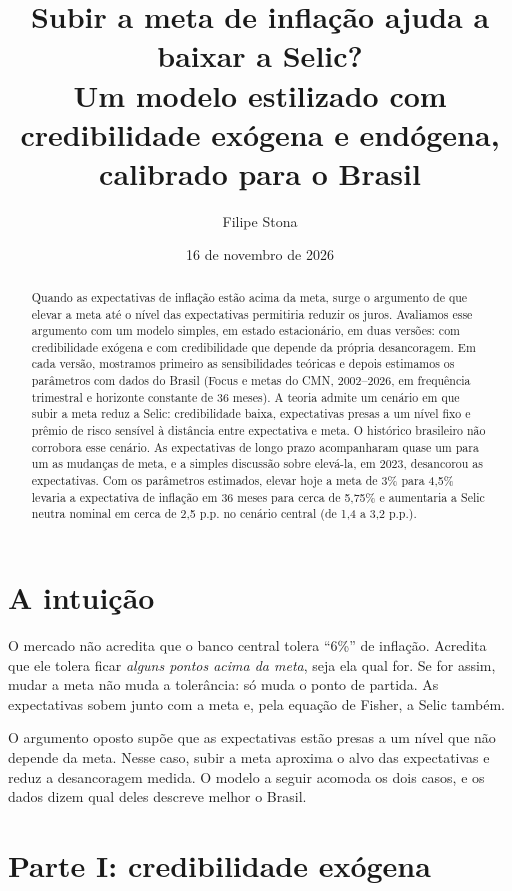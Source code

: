 \documentclass[11pt,a4paper]{article}
\title{Subir a meta de inflação ajuda a baixar a Selic?\\[0.3em]
\large Um modelo estilizado com credibilidade exógena e endógena, calibrado para o Brasil}
\author{Filipe Stona}
\date{16 de novembro de 2026}
\begin{document}
\maketitle

\begin{abstract}
\noindent Quando as expectativas de inflação estão acima da meta, surge o argumento de que elevar a meta até o nível das expectativas permitiria reduzir os juros. Avaliamos esse argumento com um modelo simples, em estado estacionário, em duas versões: com credibilidade exógena e com credibilidade que depende da própria desancoragem. Em cada versão, mostramos primeiro as sensibilidades teóricas e depois estimamos os parâmetros com dados do Brasil (Focus e metas do CMN, 2002--2026, em frequência trimestral e horizonte constante de 36 meses). A teoria admite um cenário em que subir a meta reduz a Selic: credibilidade baixa, expectativas presas a um nível fixo e prêmio de risco sensível à distância entre expectativa e meta. O histórico brasileiro não corrobora esse cenário. As expectativas de longo prazo acompanharam quase um para um as mudanças de meta, e a simples discussão sobre elevá-la, em 2023, desancorou as expectativas. Com os parâmetros estimados, elevar hoje a meta de 3\% para 4,5\% levaria a expectativa de inflação em 36 meses para cerca de 5,75\% e aumentaria a Selic neutra nominal em cerca de 2,5 p.p. no cenário central (de 1,4 a 3,2 p.p.).
\end{abstract}


\section{A intuição}

O mercado não acredita que o banco central tolera ``6\%'' de inflação. Acredita que ele tolera ficar \emph{alguns pontos acima da meta}, seja ela qual for. Se for assim, mudar a meta não muda a tolerância: só muda o ponto de partida. As expectativas sobem junto com a meta e, pela equação de Fisher, a Selic também.

O argumento oposto supõe que as expectativas estão presas a um nível que não depende da meta. Nesse caso, subir a meta aproxima o alvo das expectativas e reduz a desancoragem medida. O modelo a seguir acomoda os dois casos, e os dados dizem qual deles descreve melhor o Brasil.

\section{Parte I: credibilidade exógena}
\end{document}
